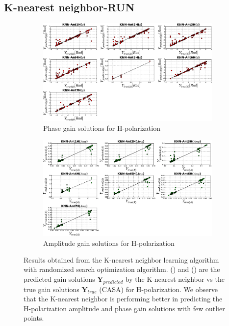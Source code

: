 \subsection{K-nearest neighbor-RUN}
\begin{figure}[H]
   \centering
    \begin{subfigure}[t]{0.52\textheight}
        
        \includegraphics[width=\textwidth]{images/KNNHphase.eps} 
        \caption{Phase gain solutions for H-polarization} \label{A4}
    \end{subfigure}
    
      \begin{subfigure}[t]{0.52\textheight}
       
        \includegraphics[width=\textwidth]{images/KNNHamp.eps} 
        \caption{Amplitude gain solutions for H-polarization} \label{B4}
    \end{subfigure}
    \caption{Results obtained from the K-nearest neighbor learning algorithm with randomized search optimization algorithm. () and () are the predicted gain solutions $\textbf{Y}_{predicted}$ by the K-nearest neighbor vs the true gain solutions $\textbf{Y}_{true}$ (CASA) for H-polarization. We observe that the K-nearest neighbor is performing better in predicting the H-polarization amplitude and phase gain solutions with few outlier points.}
    \label{BB4}
    \end{figure}
    
